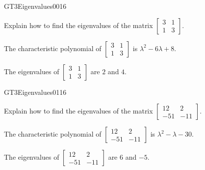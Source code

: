 \newpage




\begin{exercise}{GT3}{Eigenvalues}{0016} 
\begin{exerciseStatement} 

Explain how to find the eigenvalues of the matrix \(\left[\begin{array}{cc}
3 & 1 \\
1 & 3
\end{array}\right]\).

 \end{exerciseStatement}
 \begin{exerciseAnswer} 

The characteristic polynomial of \(\left[\begin{array}{cc}
3 & 1 \\
1 & 3
\end{array}\right]\) is \(\lambda^{2} - 6 \lambda + 8\).

 

The eigenvalues of \(\left[\begin{array}{cc}
3 & 1 \\
1 & 3
\end{array}\right]\) are \(2\) and \(4\).

 \end{exerciseAnswer}
 \end{exercise}



\begin{exercise}{GT3}{Eigenvalues}{0116} 
\begin{exerciseStatement} 

Explain how to find the eigenvalues of the matrix \(\left[\begin{array}{cc}
12 & 2 \\
-51 & -11
\end{array}\right]\).

 \end{exerciseStatement}
 \begin{exerciseAnswer} 

The characteristic polynomial of \(\left[\begin{array}{cc}
12 & 2 \\
-51 & -11
\end{array}\right]\) is \(\lambda^{2} - \lambda - 30\).

 

The eigenvalues of \(\left[\begin{array}{cc}
12 & 2 \\
-51 & -11
\end{array}\right]\) are \(6\) and \(-5\).

 \end{exerciseAnswer}
 \end{exercise}


